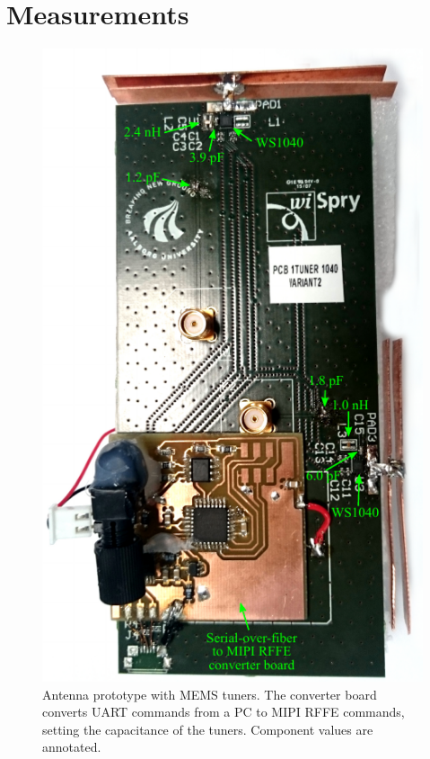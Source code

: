 \section{Measurements}
\label{sec:measurements}

\begin{figure}[tb]
    \centering
    \includegraphics{img/meas/lassedouble}
    \caption{Antenna prototype with MEMS tuners. The converter board converts UART commands from a PC to MIPI RFFE commands, setting the capacitance of the tuners. Component values are annotated.}
    \label{fig:pcb}
\end{figure}

